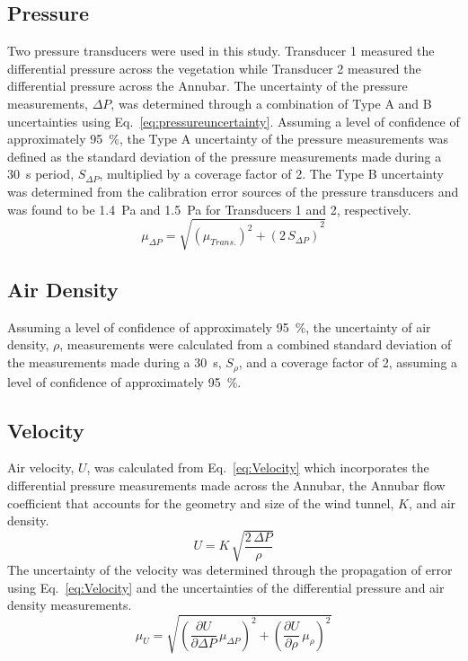 \documentclass[12pt]{article}
\begin{document}
\subsection{Pressure}\label{ssec:PressUncertainty}
Two pressure transducers were used in this study. Transducer 1 measured the differential pressure across the vegetation while Transducer 2 measured the differential pressure across the Annubar. The uncertainty of the pressure measurements, $\Delta P$, was determined through a combination of Type A and B uncertainties using Eq.~\ref{eq:pressureuncertainty}. Assuming a level of confidence of approximately 95~\%, the Type A uncertainty of the pressure measurements was defined as the standard deviation of the pressure measurements made during a 30~\si{s} period, $S_{\Delta P}$, multiplied by a coverage factor of 2. The Type B uncertainty was determined from the calibration error sources of the pressure transducers and was found to be 1.4~Pa and 1.5~Pa for Transducers 1 and 2, respectively.
\begin{equation}
\label{eq:pressureuncertainty}
\mu_{\Delta P} = \sqrt{{(\mu_{Trans.})^2+(2\,S_{\Delta P})}^2}
\end{equation}

\subsection{Air Density}\label{ssec:ADUncertainty}
Assuming a level of confidence of approximately 95~\%, the uncertainty of air density, $\rho$, measurements were calculated from a combined standard deviation of the measurements made during a 30~\si{s}, $S_{\rho}$, and a coverage factor of 2, assuming a level of confidence of approximately 95~\%.

\subsection{Velocity}\label{ssec:VelUncertainty}
Air velocity, $U$, was calculated from Eq.~\ref{eq:Velocity} which incorporates the differential pressure measurements made across the Annubar, the Annubar flow coefficient that accounts for the geometry and size of the wind tunnel, $K$, and air density. 
\begin{equation}
\label{eq:Velocity}
U = K \, \sqrt{\frac{2 \, \Delta P}{\rho}}
\end{equation}
The uncertainty of the velocity was determined through the propagation of error using Eq.~\ref{eq:Velocity} and the uncertainties of the differential pressure and air density measurements.
\begin{equation}
\label{eq:Velocityuncertainty}
\mu_{U} = \sqrt{{\left( \frac{\partial U}{\partial \Delta P}\,\mu_{\Delta P} \right) }^2+{\left(\frac{\partial U}{\partial \rho}\,\mu_{\rho}\right)}^2}
\end{equation}
\end{document}
